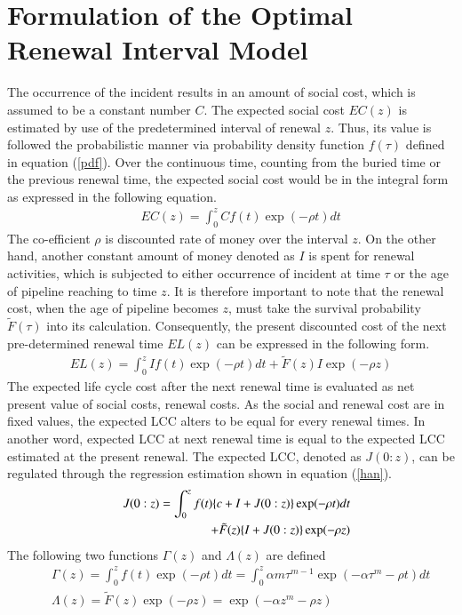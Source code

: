 \documentclass[a4paper,oneside,onecolumn,preprint,10pt,authoryear]{elsarticle}
\begin{document}
\section{Formulation of the Optimal Renewal Interval Model}
\label{56}
The occurrence of the incident results in an amount of social cost, which is assumed to be a constant number $C$. The expected social cost $EC(z)$ is estimated by use of the predetermined interval of renewal $z$. Thus, its value is followed the probabilistic manner via probability density function $f(\tau)$ defined in equation (\ref{pdf}). Over the continuous time, counting from the buried time or the previous renewal time, the expected social cost would be in the integral form as expressed in the following equation.
\begin{eqnarray}
&& EC(z)=\int_0^{z} C f(t)\exp(-\rho t)dt \label{socialcost}
\end{eqnarray}
The co-efficient $\rho$ is discounted rate of money over the interval $z$. On the other hand, another constant amount of money denoted as $I$ is spent for renewal activities, which is subjected to either occurrence of incident at time $\tau$ or the age of pipeline reaching to time $z$. It is therefore important to note that the renewal cost, when the age of pipeline becomes $z$, must take the survival probability $\tilde{F}(\tau)$ into its calculation. Consequently, the present discounted cost of the next pre-determined renewal time $EL(z)$ can be expressed in the following form.
\begin{eqnarray}
EL(z)=\int_0^{z} I f(t)\exp(-\rho t)dt +  \tilde{F}(z)I \exp(-\rho z) \label{totalcost}
\end{eqnarray}
The expected life cycle cost after the next renewal time is evaluated as net present value of social costs, renewal costs. As the social and renewal cost are in fixed values, the expected LCC alters to be equal for every renewal times. In another word, expected LCC at next renewal time is equal to the expected LCC estimated at the present renewal. The expected LCC, denoted as $J(0:z)$, can be regulated through the regression estimation shown in equation (\ref{han}).
\begin{eqnarray}
&& J(0:z)= \int_0^{z} f(t)\{c+I+J(0:z)\} \exp(-\rho t)dt  \nonumber \\
&& \hspace{10mm} + \tilde{F}(z)\{I+J(0:z)\} \exp(-\rho z)  \label{han}
\end{eqnarray}
The following two functions $\Gamma(z)$ and $\Lambda(z)$ are defined
\begin{eqnarray}
&& \Gamma(z)=\int_0^{z} f(t)\exp(-\rho t)dt 
 = \int_0^z  \alpha m\tau^{m-1}\exp(- \alpha \tau^m-\rho t)dt \label{gamma}\\
&& \Lambda(z)= \tilde{F}(z) \exp(-\rho z)
  =\exp(- \alpha z^m-\rho z)  \label{alpha}
\end{eqnarray}
\end{document}
